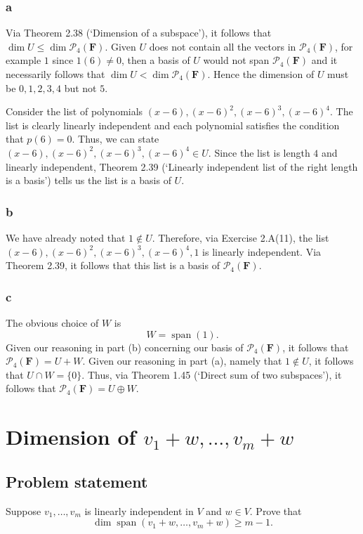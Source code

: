 \documentclass{article}
\begin{document}
\subsubsection*{a}
Via Theorem 2.38 (`Dimension of a subspace'), it follows that\newline $\operatorname{dim}U\leq\operatorname{dim}\mathcal{P}_4(\mathbf{F})$.
Given $U$ does not contain all the vectors in $\mathcal{P}_4(\mathbf{F})$, for example $1$ since $1(6)\neq 0$, then a basis of $U$ would not span $\mathcal{P}_4(\mathbf{F})$ and it necessarily follows that $\operatorname{dim}U<\operatorname{dim}\mathcal{P}_4(\mathbf{F})$. 
Hence the dimension of $U$ must be $0,1,2,3,4$ but not $5$.

Consider the list of polynomials $(x-6),(x-6)^2,(x-6)^3,(x-6)^4$. 
The list is clearly linearly independent and each polynomial satisfies the condition that $p(6)=0$. 
Thus, we can state $(x-6),(x-6)^2,(x-6)^3,(x-6)^4\in U$. 
Since the list is length $4$ and linearly independent, Theorem 2.39 (`Linearly independent list of the right length is a basis') tells us the list is a basis of $U$. 

\subsubsection*{b}
We have already noted that $1\notin U$. 
Therefore, via Exercise 2.A(11), the list $(x-6),(x-6)^2,(x-6)^3,(x-6)^4,1$ is linearly independent. 
Via Theorem 2.39, it follows that this list is a basis of $\mathcal{P}_4(\mathbf{F})$.

\subsubsection*{c}
The obvious choice of $W$ is 
\[W=\operatorname{span}(1).\]
Given our reasoning in part (b) concerning our basis of $\mathcal{P}_4(\mathbf{F})$, it follows that $\mathcal{P}_4(\mathbf{F})=U + W$. 
Given our reasoning in part (a), namely that $1\notin U$, it follows that $U\cap W=\{0\}$. 
Thus, via Theorem 1.45 (`Direct sum of two subspaces'), it follows that $\mathcal{P}_4(\mathbf{F})=U\oplus W$.

\clearpage

\renewcommand{\thesection}{9}
\section{Dimension of $v_1+w,\ldots,v_m+w$}
\subsection*{Problem statement}
Suppose $v_1,\dots,v_m$ is linearly independent in $V$ and $w\in V$. 
Prove that 
\[\operatorname{dim}\operatorname{span}(v_1+w,\ldots,v_m+w)\geq m-1.\]
\end{document}
